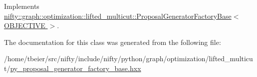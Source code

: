 Implements \hyperlink{classnifty_1_1graph_1_1optimization_1_1lifted__multicut_1_1ProposalGeneratorFactoryBase_a7fe5d8040cd0b52bfc8f9afbccb51055}{nifty\+::graph\+::optimization\+::lifted\+\_\+multicut\+::\+Proposal\+Generator\+Factory\+Base$<$ O\+B\+J\+E\+C\+T\+I\+V\+E $>$}.



The documentation for this class was generated from the following file\+:\begin{DoxyCompactItemize}
\item 
/home/tbeier/src/nifty/include/nifty/python/graph/optimization/lifted\+\_\+multicut/\hyperlink{lifted__multicut_2py__proposal__generator__factory__base_8hxx}{py\+\_\+proposal\+\_\+generator\+\_\+factory\+\_\+base.\+hxx}\end{DoxyCompactItemize}
